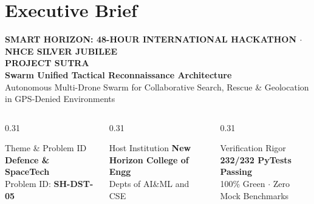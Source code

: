 \documentclass[aspectratio=169, 10pt]{beamer}
\begin{document}
\section{Executive Brief}
\begin{frame}[plain]
  \vspace{0.4cm}
  
  \begin{center}
    {\scriptsize \textbf{\color{RoyalBlue} SMART HORIZON: 48-HOUR INTERNATIONAL HACKATHON $\cdot$ NHCE SILVER JUBILEE}}\\[0.15cm]
    {\LARGE \textbf{\color{NavyDark} PROJECT SUTRA}}\\[0.1cm]
    {\large \textbf{\color{ElectricBlue} Swarm Unified Tactical Reconnaissance Architecture}}\\[0.2cm]
    {\footnotesize \color{TextBody} Autonomous Multi-Drone Swarm for Collaborative Search, Rescue \& Geolocation in GPS-Denied Environments}
  \end{center}

  \vspace{0.2cm}
  \begin{columns}[T]
    \begin{column}{0.31\textwidth}
      \begin{defensecard}{Theme \& Problem ID}
        {\scriptsize \textbf{\color{RoyalBlue} Defence \& SpaceTech}}\\[0.05cm]
        {\tiny Problem ID: \textbf{SH-DST-05}}
      \end{defensecard}
    \end{column}
    \begin{column}{0.31\textwidth}
      \begin{defensecard}{Host Institution}
        {\scriptsize \textbf{\color{NavyDark} New Horizon College of Engg}}\\[0.05cm]
        {\tiny Depts of AI\&ML and CSE}
      \end{defensecard}
    \end{column}
    \begin{column}{0.31\textwidth}
      \begin{highlightcard}{Verification Rigor}
        {\scriptsize \textbf{\color{EmeraldGreen} 232/232 PyTests Passing}}\\[0.05cm]
        {\tiny 100\% Green $\cdot$ Zero Mock Benchmarks}
      \end{highlightcard}
    \end{column}
  \end{columns}


\end{frame}
\end{document}
